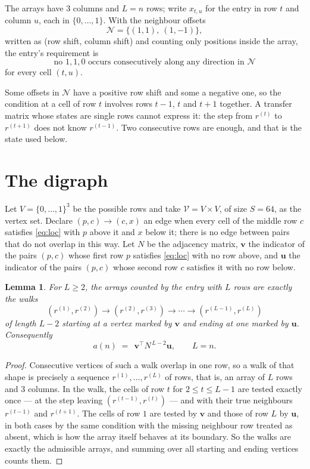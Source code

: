 \documentclass[11pt,a4paper]{article}
\theoremstyle{plain}
\newtheorem{lemma}[theorem]{Lemma}
\theoremstyle{definition}
\begin{document}
The arrays have $3$ columns and $L=n$ rows; write $x_{t,u}$ for the entry in
row $t$ and column $u$, each in $\{0,\dots,1\}$. With the neighbour offsets
\[
\mathcal N=\{(1,1),\ (1,-1)\},
\]
written as (row shift, column shift) and counting only positions inside the array, the
entry's requirement is
\begin{equation}\label{eq:loc}
\text{no }1,1,0\text{ occurs consecutively along any direction in }\mathcal N
\end{equation}
for every cell $(t,u)$.

Some offsets in $\mathcal N$ have a positive row shift and some a negative one, so the
condition at a cell of row $t$ involves rows $t-1$, $t$ and $t+1$ together. A transfer
matrix whose states are single rows cannot express it: the step from $r^{(t)}$ to
$r^{(t+1)}$ does not know $r^{(t-1)}$. Two consecutive rows are enough, and that is
the state used below.

\section{The digraph}

Let $V=\{0,\dots,1\}^{3}$ be the possible rows and take
$\mathcal V=V\times V$, of size $S=64$, as the vertex set. Declare $(p,c)\to(c,x)$ an edge
when every cell of the middle row $c$ satisfies \eqref{eq:loc} with $p$ above it and $x$
below it; there is no edge between pairs that do not overlap in this way. Let $N$ be the
adjacency matrix, $\mathbf{v}$ the indicator of the pairs $(p,c)$ whose first row $p$
satisfies \eqref{eq:loc} with no row above, and $\mathbf{u}$ the indicator of
the pairs $(p,c)$ whose second row $c$ satisfies it with no row below.

\begin{lemma}\label{lem:walk}
For $L\ge2$, the arrays counted by the entry with $L$ rows are exactly the walks
\[
(r^{(1)},r^{(2)})\to(r^{(2)},r^{(3)})\to\cdots\to(r^{(L-1)},r^{(L)})
\]
of length $L-2$ starting at a vertex marked by $\mathbf{v}$ and ending at one marked by
$\mathbf{u}$. Consequently
\[
a(n)\;=\;\,\mathbf{v}^{\!\top}N^{\,L-2}\mathbf{u},\qquad L=n .
\]
\end{lemma}

\begin{proof}
Consecutive vertices of such a walk overlap in one row, so a walk of that shape is
precisely a sequence $r^{(1)},\dots,r^{(L)}$ of rows, that is, an array of $L$ rows
and $3$ columns. In the walk, the cells of row $t$ for $2\le t\le L-1$ are tested
exactly once --- at the step leaving $(r^{(t-1)},r^{(t)})$ --- and with their true
neighbours $r^{(t-1)}$ and $r^{(t+1)}$. The cells of row $1$ are tested by
$\mathbf{v}$ and those of row $L$ by $\mathbf{u}$, in both cases by the same condition
with the missing neighbour row treated as absent, which is how the array itself behaves at
its boundary. So the walks are exactly the admissible arrays, and summing over all starting
and ending vertices counts them.
\end{proof}
\end{document}
